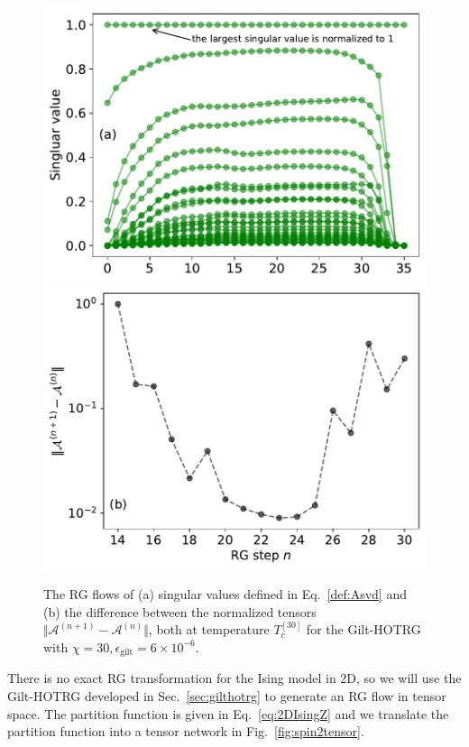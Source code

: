 \documentclass[aps,prb,reprint,superscriptaddress,floatfix]{revtex4-2}
\begin{document}
\begin{figure}[tb]
    \includegraphics[width=\columnwidth]{./figures/flowA-singVal.pdf}
    \includegraphics[width=\columnwidth]{./figures/flowA-diff.pdf}
    \caption{\label{fig:flowA}
        The RG flows of (a) singular values defined in Eq.~\eqref{def:Asvd} and (b) the difference between the normalized tensors $\Vert \mathcal{A}^{(n+1)} - \mathcal{A}^{(n)} \Vert$, both at temperature $T_c^{[30]}$ for the Gilt-HOTRG with $\chi = 30, \epsilon_{\text{gilt}} = 6\times 10^{-6}$.
    }
\end{figure}
%
There is no exact RG transformation for the Ising model in 2D, so we will use the Gilt-HOTRG developed in Sec.~\ref{sec:gilthotrg} to generate an RG flow in tensor space. 
The partition function is given in Eq.~\eqref{eq:2DIsingZ} and we translate the partition function into a tensor network in Fig.~\ref{fig:spin2tensor}. 
\end{document}
